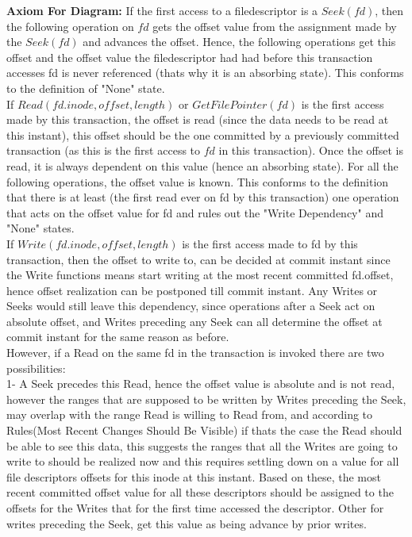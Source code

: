 \documentclass[a4paper, 11pt]{article}
\begin{document}
\textbf{Axiom For Diagram:} If the first access to a filedescriptor is a $Seek(fd)$, then the following operation on $fd$ gets the offset value from the assignment made by the $Seek(fd)$ and advances the offset. Hence, the following operations get this offset and the offset value the filedescriptor had had before this transaction accesses fd is never referenced (thats why it is an absorbing state). This conforms to the definition of "None" state.\\ 

If $Read(fd.inode, offset, length)$ or $GetFilePointer(fd)$ is the first access made by this transaction, the offset is read (since the data needs to be read at this instant), this offset should be the one committed by a previously committed transaction (as this is the first access to $fd$ in this transaction). Once the offset is read, it is always dependent on this value (hence an absorbing state). For all the following operations, the offset value is known. This conforms to the definition that there is at least (the first read ever on fd by this transaction) one operation that acts on the offset value for fd and rules out the "Write Dependency" and "None" states.\\

If $Write(fd.inode, offset, length)$ is the first access made to fd by this transaction, then the offset to write to, can be decided at commit instant since the Write functions means start writing at the most recent committed fd.offset, hence offset realization can be postponed till commit instant. Any Writes or Seeks would still leave this dependency, since operations after a Seek act on absolute offset, and Writes preceding any Seek can all determine the offset at commit instant for the same reason as before.\\    

However, if a Read on the same fd in the transaction is invoked there are two possibilities:\\

1- A Seek precedes this Read, hence the offset value is absolute and is not read, however the ranges that are supposed to be written by Writes preceding the Seek, may overlap with the range Read is willing to Read from, and according to Rules(Most Recent Changes Should Be Visible) if thats the case the Read should be able to see this data, this suggests the ranges that all the Writes are going to write to should be realized now and this requires settling down on a value for all file descriptors offsets for this inode at this instant. Based on these, the most recent committed offset value for all these descriptors should be assigned to the offsets for the Writes that for the first time accessed the descriptor. Other for writes preceding the Seek, get this value as being advance by prior writes.\\
\end{document}
